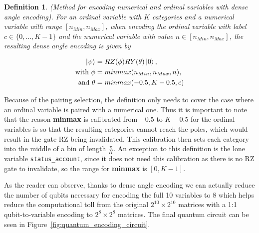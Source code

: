 \documentclass{ieeeaccess}
\newtheorem{definition}{Definition}[section]
\begin{document}
\begin{definition}
  (Method for encoding numerical and ordinal variables with dense angle encoding). For an ordinal variable with $K$ categories and a numerical variable with range $[n_{Min}, n_{Max}]$, when encoding the ordinal variable with label $c \in \{0, \dots, K-1\}$ and the numerical variable with value $n \in [n_{Min}, n_{Max}]$, the resulting dense angle encoding is given by

  \begin{align*}
    \ket{\psi} &= RZ(\phi)RY(\theta)\ket{0},\\
    \text{with } \phi &= minmax(n_{Min}, n_{Max}, n),\\
    \text{and } \theta &= minmax(-0.5, K - 0.5, c)
  \end{align*}
  \label{def:encoding_dense_angle}
\end{definition}

Because of the pairing selection, the definition only needs to cover the case where an ordinal variable is paired with a numerical one. Thus it is important to note that the reason \textbf{minmax} is calibrated from $-0.5$ to $K-0.5$ for the ordinal variables is so that the resulting categories cannot reach the poles, which would result in the gate RZ being invalidated. This calibration then sets each category into the middle of a bin of length $\frac{\pi}{K}$. An exception to this definition is the lone variable \texttt{status\_account}, since it does not need this calibration as there is no RZ gate to invalidate, so the range for \textbf{minmax} is $[0, K-1]$.

As the reader can observe, thanks to dense angle encoding we can actually reduce the number of qubits necessary for encoding the full 10 variables to 8 which helps reduce the computational toll from the original $2^{10}\times 2^{10}$ matrices with a 1:1 qubit-to-variable encoding to $2^{8}\times 2^{8}$ matrices. The final quantum circuit can be seen in Figure~\ref{fig:quantum_encoding_circuit}.
\end{document}
